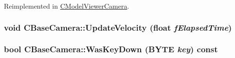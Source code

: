 Reimplemented in \hyperlink{class_c_model_viewer_camera_a3cfc3e0fd350457b4206054c96fc39f7}{CModelViewerCamera}.\hypertarget{class_c_base_camera_afcca5c9bdc793eb6f1f8c0530b8b93f2}{
\subsubsection[{UpdateVelocity}]{\setlength{\rightskip}{0pt plus 5cm}void CBaseCamera::UpdateVelocity (float {\em fElapsedTime})}}
\label{class_c_base_camera_afcca5c9bdc793eb6f1f8c0530b8b93f2}
\hypertarget{class_c_base_camera_ab4e5634db9c77f98b4f1f87b4de391dd}{
\subsubsection[{WasKeyDown}]{\setlength{\rightskip}{0pt plus 5cm}bool CBaseCamera::WasKeyDown (BYTE {\em key}) const}}
\label{class_c_base_camera_ab4e5634db9c77f98b4f1f87b4de391dd}


